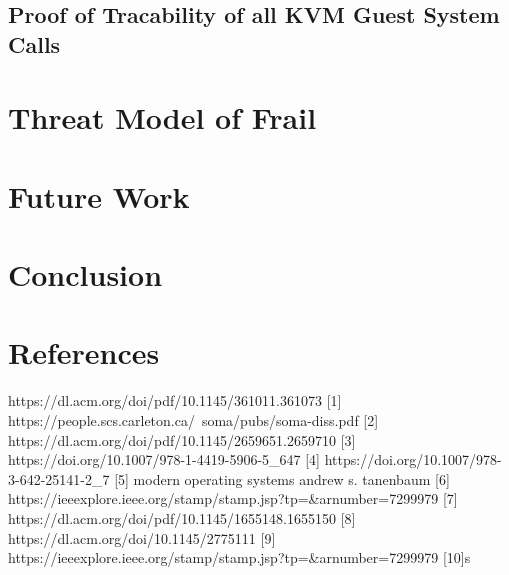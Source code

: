 \documentclass{report}
\begin{document}
\begin{spacing}{1.5}
\section{Proof of Tracability of all KVM Guest System Calls}

\chapter{Threat Model of Frail}


\chapter{Future Work}

\chapter{Conclusion}

\chapter{References}

{\large
https://dl.acm.org/doi/pdf/10.1145/361011.361073 [1]
https://people.scs.carleton.ca/~soma/pubs/soma-diss.pdf [2]
https://dl.acm.org/doi/pdf/10.1145/2659651.2659710 [3]
https://doi.org/10.1007/978-1-4419-5906-5\_647 [4]
https://doi.org/10.1007/978-3-642-25141-2\_7 [5]
modern operating systems andrew s. tanenbaum [6]
https://ieeexplore.ieee.org/stamp/stamp.jsp?tp=\&arnumber=7299979 [7]
https://dl.acm.org/doi/pdf/10.1145/1655148.1655150 [8]
https://dl.acm.org/doi/10.1145/2775111 [9]
https://ieeexplore.ieee.org/stamp/stamp.jsp?tp=\&arnumber=7299979 [10]s
}
\end{spacing}
\end{document}
